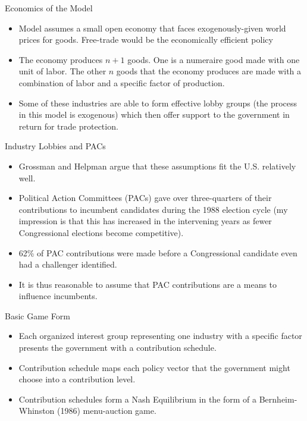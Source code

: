 \documentclass[aspectratio=169]{beamer}
\begin{document}

\begin{frame}{Economics of the Model}

\begin{itemize}
    \item<1-> Model assumes a small open economy that faces exogenously-given world prices for goods.  Free-trade would be the economically efficient policy
    \item<2-> The economy produces $ n + 1 $ goods.  One is a numeraire good made with one unit of labor.  The other $ n $ goods that the economy produces are made with a combination of labor and a specific factor of production.
    \item<3-> Some of these industries are able to form effective lobby groups (the process in this model is exogenous) which then offer support to the government in return for trade protection.
\end{itemize}
    
\end{frame}


\begin{frame}{Industry Lobbies and PACs}

\begin{itemize}
    \item<1-> Grossman and Helpman argue that these assumptions fit the U.S. relatively well.
    \item<2-> Political Action Committees (PACs) gave over three-quarters of their contributions to incumbent candidates during the 1988 election cycle (my impression is that this has increased in the intervening years as fewer Congressional elections become competitive).
    \item<3-> 62\% of PAC contributions were made before a Congressional candidate even had a challenger identified.
    \item<4-> It is thus reasonable to assume that PAC contributions are a means to influence incumbents.
\end{itemize}
    
\end{frame}


\begin{frame}{Basic Game Form}

\begin{itemize}
    \item<1-> Each organized interest group representing one industry with a specific factor presents the government with a contribution schedule.
    \item<2-> Contribution schedule maps each policy vector that the government might choose into a contribution level.
    \item<3-> Contribution schedules form a Nash Equilibrium in the form of a Bernheim-Whinston (1986) menu-auction game.
\end{itemize}
    
\end{frame}
\end{document}
